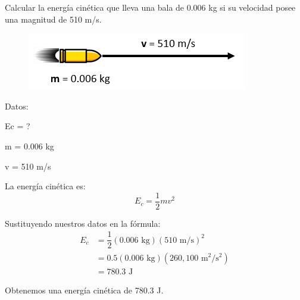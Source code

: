 \question[5] Calcular la energía cinética que lleva una bala de 0.006 kg si su velocidad posee una magnitud de 510 m/s.

\begin{minipage}{0.3\textwidth}
    \begin{figure}[H]
        \includegraphics[width=\linewidth]{../images/energia_cinetica_problema_1.png}
    \end{figure}
\end{minipage}\hfill
\begin{minipage}{0.65\textwidth}
    \begin{solutionbox}{6cm}
        \begin{multicols}{2}
            Datos:

            Ec = ?

            m = 0.006 kg

            v = 510 m/s

            La energía cinética es:
            \[E_c=\frac{1}{2}mv^2\]

            \vspace{2cm}

            Sustituyendo nuestros datos en la fórmula:
            \[
                \begin{array}{rl}
                    E_c & = \dfrac{1}{2} (0.006 \text{ kg})(510 \text{ m/s})^2  \\[1em]
                        & = 0.5 (0.006 \text{ kg})(260,100 \text{ m$^2$/s$^2$}) \\[1em]
                        & =780.3 \text{ J }
                \end{array}
            \]
        \end{multicols}
        \begin{center}Obtenemos una energía cinética de 780.3 J.\end{center}
    \end{solutionbox}
\end{minipage}